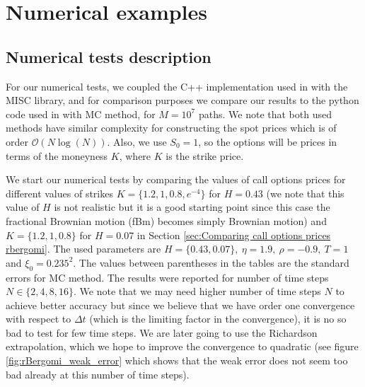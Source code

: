 \documentclass[11pt]{article}
\newcommand{\Ordo}[1]{{\mathcal{O}}\left(#1\right)}
\begin{document}
\section{Numerical examples}


\subsection{Numerical tests description}
For our numerical tests, we coupled the C++ implementation used in \cite{bayer2016pricing} with the MISC library, and for comparison purposes we compare our results to the python code used in \cite{mccrickerd2017turbocharging} with MC method, for $M=10^7$ paths. We note that both used methods have similar complexity for constructing the spot prices which is of order $\Ordo{N \log(N)}$. Also, we use $S_0=1$, so the options will be prices in terms of the moneyness $K$, where $K$ is the strike price.

We start our numerical tests by comparing the values of call options  prices for different values of strikes $K=\{1.2, 1,0.8, e^{-4}\} $ for $H=0.43$ (we note that this value of $H$ is not realistic but it is a good starting point since this case the fractional Brownian motion (fBm) becomes simply Brownian motion) and $K=\{1.2, 1,0.8\} $ for $H=0.07$  in Section \ref{sec:Comparing call options prices rbergomi}. The used parameters are $H=\{0.43, 0.07\},\: \eta=1.9, \: \rho=-0.9,\: T=1$ and $\xi_0=0.235^2$. The values between parentheses in the tables are the standard errors for MC method. The results were reported for number of time steps $N \in \{2,4,8,16\}$. We note that we may need higher number of time steps $N$ to  achieve better accuracy but since  we believe that we have order one convergence with respect to $\Delta t$ (which is the limiting factor in the convergence), it is no so bad to test for few time steps. We  are later going to use the Richardson extrapolation, which we  hope to improve the convergence to  quadratic (see figure  \ref{fig:rBergomi_weak_error} which shows that  the weak error does not seem too bad already at this number of time steps).
\end{document}
